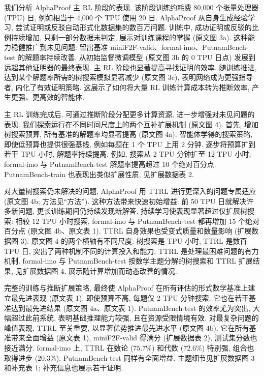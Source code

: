 \label{alphaproof-main-rl}
我们分析 AlphaProof 主 RL 阶段的表现. 该阶段训练约耗费 80,000 个张量处理器 (TPU) 日, 例如相当于 4,000 个 TPU 使用 20 日. AlphaProof 从自身生成经验学习, 尝试证明或反驳自动形式化数据集的数百万问题. 训练中, 成功证明或反驳的比例持续增加, 只剩一部分数据未判定, 展示对训练课程的掌握 (原文图 3a). 这种能力稳健推广到未见问题: 留出基准 miniF2F-valid、formal-imo、PutnamBench-test 的解题率持续改善, 从初始监督微调模型 (原文图 3b 的 0 TPU 日点) 发展到远超其他证明器的最终表现. 主 RL 阶段也显著提高寻找证明的效率. 随训练推进, 达到某个解题率所需的树搜索模拟显著减少 (原文图 3c), 表明网络成为更强指导者, 内化了有效证明策略. 这展示了如何将大量 RL 训练计算成本转为推断效率, 产生更强、更高效的智能体.



\label{alphaproof-inference-scaling}
主 RL 训练完成后, 可通过推断阶段分配更多计算资源, 进一步增强对未见问题的表现. 我们探索运行在不同时间尺度上的两个互补扩展机制 (原文图 4). 首先, 增加树搜索预算, 所有基准的解题率均显著提高 (原文图 4a). 智能体学得的搜索策略, 即使低预算也提供很强基线, 例如每题在 1 个 TPU 上用 2 分钟. 逐步将预算扩到若干 TPU 小时, 解题率持续提高. 例如, 搜索从 2 TPU 分钟扩至 12 TPU 小时, formal-imo 与 PutnamBench-test 解题率提高超过 10 个绝对百分点. PutnamBench-train 也表现出类似扩展性质, 见扩展数据表 2.

对大量树搜索仍未解决的问题, AlphaProof 用 TTRL 进行更深入的问题专属适应 (原文图 4b; 方法见“方法”). 这种方法带来快速初始增益: 前 50 TPU 日就解决许多新问题, 更长训练期间仍持续发现新解答. 持续学习使表现显著超过仅扩展树搜索: 相较 12 TPU 小时搜索, formal-imo 与 PutnamBench-test 都再增加 15 个绝对百分点 (原文图 4b、原文表 1). TTRL 自身效果也受变式质量和数量影响 (扩展数据图 3). 原文图 4 的两个横轴有不同尺度: 树搜索是 TPU 小时, TTRL 是数百 TPU 日, 突出了两种机制不同的计算投入和能力. TTRL 是处理最困难问题的有力机制. formal-imo 与 PutnamBench-test 按数学主题分解的树搜索和 TTRL 扩展结果, 见扩展数据图 4, 展示随计算增加而动态改善的情况.



\label{alphaproof-final-evaluation}
完整的训练与推断扩展策略, 最终使 AlphaProof 在所有评估的形式数学基准上建立最先进表现 (原文表 1). 即使预算不高, 每题仅 2 TPU 分钟搜索, 它也在若干基准达到最先进结果 (原文图 4a、原文表 1). PutnamBench-test 的效率尤为突出, 大幅超过此前系统, 表明基础推理能力较强, 且在资源受限情境有效. 对最复杂问题的峰值表现, TTRL 至关重要, 以显著优势推进最先进水平 (原文图 4b). 它在所有基准带来全面增益 (原文表 1), miniF2F-valid 得满分 (扩展数据表 2), 测试集分数也接近满分. formal-imo 上, TTRL 在数论 ($75.7\%$) 和代数 ($72.6\%$) 特别强, 组合也取得进步 ($20.3\%$). PutnamBench-test 同样有全面增益. 主题细节见扩展数据图 3 和补充表 1; 补充信息也展示若干证明.

